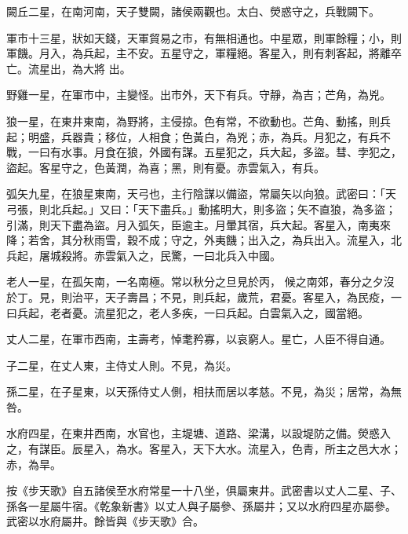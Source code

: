 \begin{pinyinscope}
 闕丘二星，在南河南，天子雙闕，諸侯兩觀也。太白、熒惑守之，兵戰闕下。



 軍市十三星，狀如天錢，天軍貿易之市，有無相通也。中星眾，則軍餘糧；小，則軍饑。月入，為兵起，主不安。五星守之，軍糧絕。客星入，則有刺客起，將離卒亡。流星出，為大將
 出。



 野雞一星，在軍市中，主變怪。出市外，天下有兵。守靜，為吉；芒角，為兇。



 狼一星，在東井東南，為野將，主侵掠。色有常，不欲動也。芒角、動搖，則兵起；明盛，兵器貴；移位，人相食；色黃白，為兇；赤，為兵。月犯之，有兵不戰，一曰有水事。月食在狼，外國有謀。五星犯之，兵大起，多盜。彗、孛犯之，盜起。客星守之，色黃潤，為喜；黑，則有憂。赤雲氣入，有兵。



 弧矢九星，在狼星東南，天弓也，主行陰謀以備盜，常屬矢以向狼。武密曰：「天弓張，則北兵起。」又曰：「天下盡兵。」動搖明大，則多盜；矢不直狼，為多盜；引滿，則天下盡為盜。月入弧矢，臣逾主。月暈其宿，兵大起。客星入，南夷來降；若舍，其分秋雨雪，穀不成；守之，外夷饑；出入之，為兵出入。流星入，北兵起，屠城殺將。赤雲氣入之，民驚，一曰北兵入中國。



 老人一星，在孤矢南，一名南極。常以秋分之旦見於丙，
 候之南郊，春分之夕沒於丁。見，則治平，天子壽昌；不見，則兵起，歲荒，君憂。客星入，為民疫，一曰兵起，老者憂。流星犯之，老人多疾，一曰兵起。白雲氣入之，國當絕。



 丈人二星，在軍市西南，主壽考，悼耄矜寡，以哀窮人。星亡，人臣不得自通。



 子二星，在丈人東，主侍丈人則。不見，為災。



 孫二星，在子星東，以天孫侍丈人側，相扶而居以孝慈。不見，為災；居常，為無咎。



 水府四星，在東井西南，水官也，主堤塘、道路、梁溝，以設堤防之備。熒惑入之，有謀臣。辰星入，為水。客星入，天下大水。流星入，色青，所主之邑大水；赤，為旱。



 按《步天歌》自五諸侯至水府常星一十八坐，俱屬東井。武密書以丈人二星、子、孫各一星屬牛宿。《乾象新書》以丈人與子屬參、孫屬井；又以水府四星亦屬參。武密以水府屬井。餘皆與《步天歌》合。




\end{pinyinscope}
